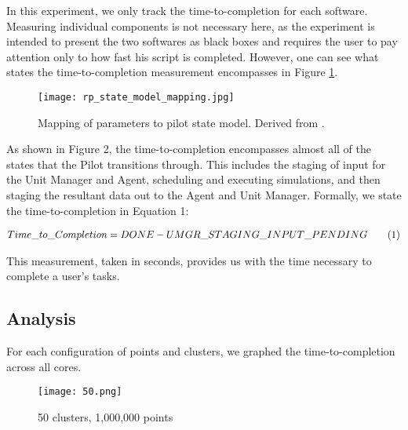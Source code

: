 \documentclass[]{article}
\newcommand\numberthis{\addtocounter{equation}{1}\tag{\theequation}}
\begin{document}
		In this experiment, we only track the time-to-completion for each software. Measuring individual components is not necessary here, as the experiment is intended to present the two softwares as black boxes and requires the user to pay attention only to how fast his script is completed. However, one can see what states the time-to-completion measurement encompasses in Figure \ref{fig:pilot_state_mapping}.

		\begin{figure}[H]
			\centering
			\texttt{[image: rp\_state\_model\_mapping.jpg]}
			\caption{Mapping of parameters to pilot state model. Derived from \cite{rp_state_diagram}.}
			\label{fig:pilot_state_mapping}
		\end{figure}

		As shown in Figure 2, the time-to-completion encompasses almost all of the states that the Pilot transitions through. This includes the staging of input for the Unit Manager and Agent, scheduling and executing simulations, and then staging the resultant data out to the Agent and Unit Manager. Formally, we state the time-to-completion in Equation 1:

		\begin{align*}
			Time\_to\_Completion = DONE - UMGR\_STAGING\_INPUT\_PENDING \numberthis \label{1}
		\end{align*}

		This measurement, taken in seconds, provides us with the time necessary to complete a user's tasks.

	\subsection{Analysis}

		For each configuration of points and clusters, we graphed the time-to-completion across all cores.

		\begin{figure}[H]
			\centering
			\texttt{[image: 50.png]}
			\caption{50 clusters, 1,000,000 points}
			\label{fig:50}
		\end{figure}
\end{document}
